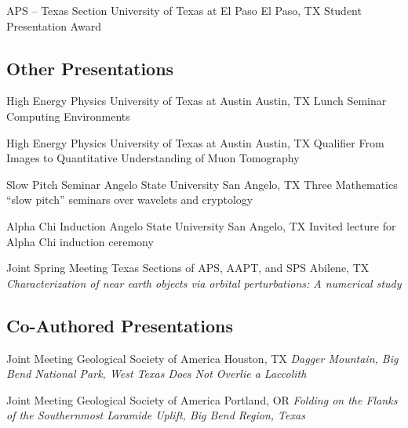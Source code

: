 \documentclass[10pt,letterpaper,english]{moderncv}
\begin{document}
{APS -- Texas Section}
{University of Texas at El Paso}
{El Paso, TX}
{Student Presentation Award}


\subsection{Other Presentations}
{High Energy Physics}
{University of Texas at Austin}
{Austin, TX}
{Lunch Seminar}%
{Computing Environments}

{High Energy Physics}
{University of Texas at Austin}
{Austin, TX}
{Qualifier}%
{From Images to Quantitative Understanding of Muon Tomography}

{Slow Pitch Seminar}
{Angelo State University}
{San Angelo, TX}
{Three Mathematics ``slow pitch'' seminars over wavelets and cryptology}

{Alpha Chi Induction}
{Angelo State University}
{San Angelo, TX}
{Invited lecture for Alpha Chi induction ceremony}

{Joint Spring Meeting}
{Texas Sections of APS, AAPT, and SPS}
{Abilene, TX}
{\emph{Characterization of near earth objects via orbital perturbations: A numerical study}} %


\subsection{Co-Authored Presentations}

{Joint Meeting}
{Geological Society of America}
{Houston, TX}
{\emph{Dagger Mountain, Big Bend National Park, West Texas Does Not Overlie a Laccolith}}

{Joint Meeting}
{Geological Society of America}
{Portland, OR}
{\emph{Folding on the Flanks of the Southernmost Laramide Uplift, Big Bend Region, Texas}}

\end{document}
